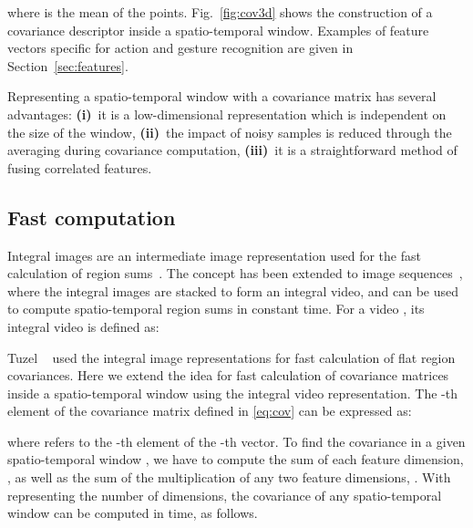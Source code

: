 \documentclass[10pt,twocolumn,letterpaper]{article}
\newcommand{\fig}[1]{\mbox{Fig.~\ref{#1}}}
\newcommand{\eqsize}{\footnotesize}
\begin{document}
\vspace{-1ex}
\eqsize

\normalsize

\noindent
where {\eqsize } is the mean of the points.
\fig{fig:cov3d} shows the construction of a covariance descriptor inside a spatio-temporal window.
Examples of feature vectors specific for action and gesture recognition are given in Section~\ref{sec:features}.

Representing a spatio-temporal window with a covariance matrix has several advantages:
{\bf (i)}~it is a low-dimensional representation which is independent on the size of the window,
{\bf (ii)}~the impact of noisy samples is reduced through the averaging during covariance computation,
{\bf (iii)}~it is a straightforward method of fusing correlated features.




\subsection{Fast computation}
\label{sec:integral}

Integral images are an intermediate image representation used for the fast calculation of region sums~\cite{ViolaAndJones2001}.
The concept has been extended to image sequences~\cite{KeEtAl2005},
where the integral images are stacked to form an integral video,
and can be used to compute spatio-temporal region sums in constant time.
For a video {\eqsize }, its integral video {\eqsize } is defined as:

\vspace{-1ex}
\eqsize

\normalsize

Tuzel \etal~\cite{TuzelEtAl2008} used the integral image representations for fast calculation of flat region covariances.
Here we extend the idea for fast calculation of covariance matrices inside a spatio-temporal window using the integral video representation.
The {\eqsize }-th element of the covariance matrix defined in \eqref{eq:cov} can be expressed as:

\noindent
\eqsize

\normalsize

\noindent
where {\small } refers to the {\small }-th element of the {\small }-th vector.
To find the covariance in a given spatio-temporal window {\eqsize }, we have to compute the sum of each feature dimension, {\eqsize
}, as well as the sum of the multiplication of any two feature dimensions, {\eqsize }.
With {\eqsize } representing the number of dimensions,
the covariance of any spatio-temporal window can be computed in {\eqsize } time, as follows.
\end{document}
